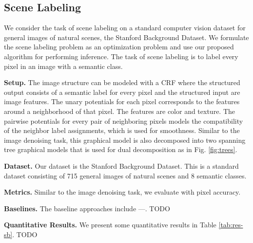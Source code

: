 \documentclass[conference]{IEEEtran}
\begin{document}
\subsection{Scene Labeling}

We consider the task of scene labeling on a standard computer vision dataset for general images of natural scenes, the Stanford Background Dataset. We formulate the scene labeling problem as an optimization problem and use our proposed algorithm for performing inference. The task of scene labeling is to label every pixel in an image with a semantic class.

{\bf Setup.} The image structure can be modeled with a CRF where the structured output consists of a semantic label for every pixel and the structured input are image features. The unary potentials for each pixel corresponds to the features around a neighborhood of that pixel. The features are color and texture. The pairwise potentials for every pair of neighboring pixels models the compatibility of the neighbor label assignments, which is used for smoothness. Similar to the image denoising task, this graphical model is also decomposed into two spanning tree graphical models that is used for dual decomposition as in Fig. \ref{fig:trees}.

{\bf Dataset.} Our dataset is the Stanford Background Dataset. This is a standard dataset consisting of 715 general images of natural scenes and 8 semantic classes.

{\bf Metrics.} Similar to the image denoising task, we evaluate with pixel accuracy.

{\bf Baselines.} The baseline approaches include ---. TODO

{\bf Quantitative Results.} We present some quantitative results in Table \ref{tab:res-sb}. TODO
\end{document}
